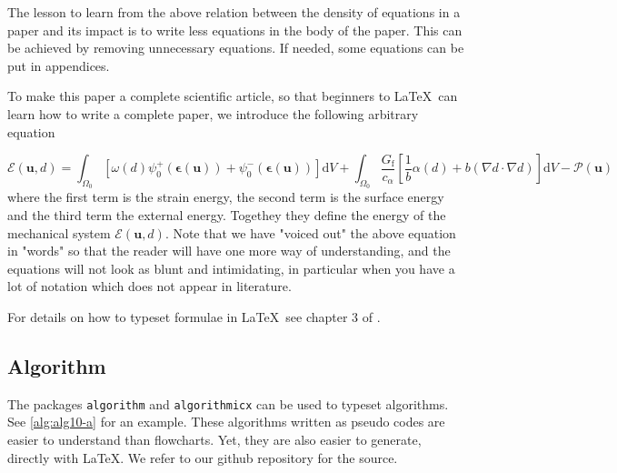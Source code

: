 \documentclass[authoryear,3p,times,preprint,review,fleqn]{elsarticle}
\newcommand{\bfepsilon}{\boldsymbol{\epsilon}}
\newcommand{\bfu}{\boldsymbol{u}}
\newcommand{\td}{\text{d}}
\numberwithin{equation}{section}
\theoremstyle{remark}
\begin{document}
The lesson to learn from the above relation between the density of equations in a paper and its impact is to write less equations in the body of the paper. This can be achieved by removing unnecessary equations. If needed, some equations can be put in appendices.

To make this paper a complete scientific article, so that beginners to \LaTeX\ can learn how to write a complete paper, we introduce the following arbitrary equation

\begin{equation}
  \mathscr{E} (\bfu, d) 
    = \int_{\varOmega_{0}} \left[\omega(d)\psi_{0}^+(\bfepsilon (\bfu)) + \psi_{0}^-(\bfepsilon (\bfu)) \right]\td V
    + \int_{\varOmega_{0}}  \frac{G_\text{f}}{c_\alpha} \left[ \frac{1}{b} \alpha(d)
    + b \left( \nabla d \cdot \nabla d \right) \right] \td V
    - \mathscr{P} (\bfu)
\label{eq:3}
\end{equation}
where the first term is the strain energy, the second term is the surface energy and the third term the external energy. Togethey they define the energy of the mechanical system $\mathscr{E} (\bfu, d)$.  Note that we have "voiced out" the above equation in "words" so that the reader will have one more way of understanding, and the equations will not look as blunt and intimidating, in particular when you have a lot of notation which does not appear in literature. 

For details on how to typeset formulae in \LaTeX\, see chapter 3 of \cite{latex}.



\subsection{Algorithm}\label{sec:algorithm}

The packages \texttt{algorithm} and \texttt{algorithmicx} can be used to typeset algorithms. See  \cref{alg:alg10-a} for an example. These algorithms written as pseudo codes are easier to understand than flowcharts. Yet, they are also easier to generate, directly with \LaTeX. We refer to our github repository for the source.\\
\end{document}
